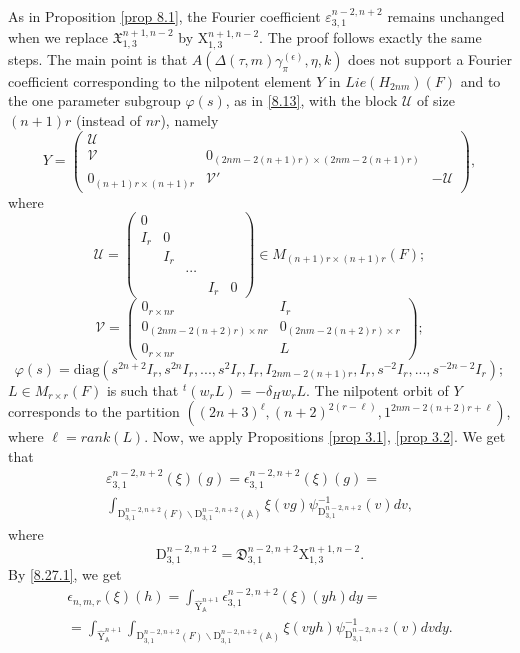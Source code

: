 \documentclass[12pts]{amsart}
\newcommand{\BA}{{\mathbb {A}}}
\newcommand{\diag}{{\mathrm{diag}}}
\newcommand{\I}{{\mathrm{I}}}
\begin{document}
As in Proposition \ref{prop 8.1}, the Fourier coefficient
$\varepsilon_{3,1}^{n-2,n+2}$ remains unchanged when we replace
$\mathfrak{X}_{1,3}^{n+1,n-2}$ by $\mathrm{X}_{1,3}^{n+1,n-2}$. The
proof follows exactly the same steps. The main point is that
$A(\Delta(\tau,m)\gamma_\pi^{(\epsilon)},\eta,k)$ does not support a Fourier coefficient corresponding
to the nilpotent element $Y$ in $Lie(H_{2nm})(F)$ and to the
one parameter subgroup $\varphi(s)$, as in \eqref{8.13}, with the block $\mathcal{U}$ of size 
$(n+1)r$ (instead of $nr$), namely
\begin{equation}\label{8.27.2}
Y=\begin{pmatrix}\mathcal{U}\\
\mathcal{V}&0_{(2nm-2(n+1)r)\times
	(2nm-2(n+1)r)}\\0_{(n+1)r\times
	(n+1)r}&\mathcal{V}'&-\mathcal{U}\end{pmatrix},
\end{equation}
where
$$
\mathcal{U}=\begin{pmatrix}0\\I_r&0\\&I_r\\
&&\cdots\\&&&I_r&0\end{pmatrix}\in M_{(n+1)r\times (n+1)r}(F);
$$
$$
\mathcal{V}=\begin{pmatrix}0_{r\times
	nr}&I_r\\0_{(2nm-2(n+2)r)\times nr}&0_{(2nm-2(n+2)r)\times
	r}\\0_{r\times nr}&L\end{pmatrix};
$$
$$
\varphi(s)=\diag(s^{2n+2}I_r,s^{2n}I_r,...,s^2I_r, I_r,
I_{2nm-2(n+1)r},I_r,s^{-2}I_r,...,s^{-2n-2}I_r);
$$
$L\in M_{r\times r}(F)$ is such that ${}^t(w_rL)=-\delta_Hw_rL$. The
nilpotent orbit of $Y$ corresponds to the partition $((2n+3)^\ell,
(n+2)^{2(r-\ell)},1^{2nm-2(n+2)r+\ell})$, where $\ell=rank(L)$.
Now, we apply Propositions \ref{prop 3.1}, \ref{prop 3.2}. We get that
\begin{multline}\label{8.28'}
\varepsilon_{3,1}^{n-2,n+2}(\xi)(g)=\epsilon_{3,1}^{n-2,n+2}(\xi)(g)=\\
\int_{\mathrm{D}_{3,1}^{n-2,n+2}(F)\backslash
	\mathrm{D}_{3,1}^{n-2,n+2}(\BA)}\xi(vg)\psi_{\mathrm{D}_{3,1}^{n-2,n+2}}^{-1}(v)dv,
\end{multline}
where
$$
\mathrm{D}_{3,1}^{n-2,n+2}=\mathfrak{D}_{3,1}^{n-2,n+2}\mathrm{X}_{1,3}^{n+1,n-2}.
$$
By \eqref{8.27.1}, we get
	\begin{multline}\label{8.27.3}
\epsilon_{n,m,r}(\xi)(h)=\int_{\hat{\mathrm{Y}}^{n+1}_\BA}\epsilon_{3,1}^{n-2,n+2}(\xi)(yh)dy
=\\
=\int_{\hat{\mathrm{Y}}^{n+1}_\BA}\int_{\mathrm{D}_{3,1}^{n-2,n+2}(F)\backslash \mathrm{D}_{3,1}^{n-2,n+2}(\BA)}\xi(vyh)\psi^{-1}_{\mathrm{D}_{3,1}^{n-2,n+2}}(v)dvdy.
\end{multline}
\end{document}
